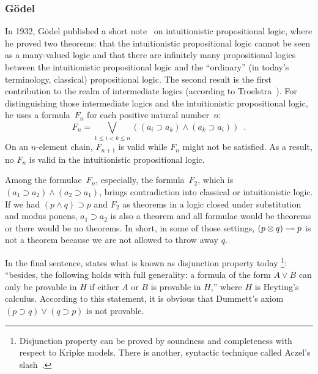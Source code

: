 \subsubsection{G\"odel}
In 1932, G\"odel published a short note~\cite{godelprop} on
intuitionistic propositional
logic, where he proved two theorems: that the intuitionistic propositional logic
cannot be seen as a many-valued logic and that
there are infinitely many propositional logics between the
intuitionistic propositional logic and the ``ordinary'' (in today's
terminology, classical) propositional logic.  The second result is the
first contribution to the realm of intermediate
logics (according to Troelstra~\cite[p.~223]{goedelcollected}).
For distinguishing those intermediate logics and the intuitionistic
propositional logic, he uses a formula~$F_n$ for each positive natural
number~$n$:
\[
 F_n = \bigvee_{1\le i < k\le n}\left((a_i\supset a_k) \land (a_k\supset a_i)\right)\enspace.
\]
On an $n$-element chain, $F_{n+1}$ is valid while $F_n$ might not be
satisfied.  As a result, no $F_n$ is valid in the intuitionistic
propositional logic.

Among the formulae~$F_n$,
especially, the formula~$F_2$, which is $(a_1\supset a_2)\land (a_2\supset
a_1)$, brings contradiction into classical or intuitionistic logic.  If we
had $(p\land q)\supset p$ and $F_2$ as theorems in a logic closed under
substitution and modus ponens,
$a_1\supset a_2$ is also a theorem and all formulae would be theorems or
there would be no theorems.
In short, in some of those settings, $(p\otimes q)\multimap p$ is
not a theorem because we are not allowed to throw away $q$.

In the final sentence, \citet{godelprop} states what is known as
disjunction property today%
\footnote{Disjunction property can be proved by soundness and
completeness with respect to Kripke models.  There is another, syntactic
technique called Aczel's slash~\citep[Ch.~3. 5.7.]{troelstra1988constructivism}.}: ``besides, the
following holds with full
generality: a formula of the form $A\lor B$ can only be provable in $H$
if either $A$ or $B$ is provable in $H$,'' where $H$ is Heyting's calculus.
According to this statement, it is obvious that Dummett's axiom
$(p\supset q) \lor (q\supset p)$ is not provable.

